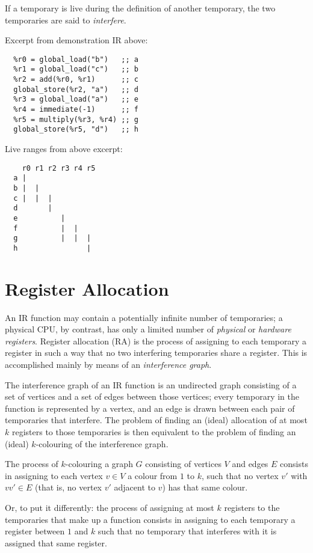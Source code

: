 \documentclass[12pt]{report}
\begin{document}
If a temporary is live during the definition of another temporary, the two temporaries are said to \emph{interfere}.

Excerpt from demonstration IR above:
\begin{Verbatim}
  %r0 = global_load("b")   ;; a
  %r1 = global_load("c")   ;; b
  %r2 = add(%r0, %r1)      ;; c
  global_store(%r2, "a")   ;; d
  %r3 = global_load("a")   ;; e
  %r4 = immediate(-1)      ;; f
  %r5 = multiply(%r3, %r4) ;; g
  global_store(%r5, "d")   ;; h
\end{Verbatim}

Live ranges from above excerpt:
\begin{Verbatim}
    r0 r1 r2 r3 r4 r5
  a |
  b |  |
  c |  |  |
  d       |
  e          |
  f          |  |
  g          |  |  |
  h                |
\end{Verbatim}

\chapter{Register Allocation}
\label{sec:codegen-register-allocation}
An IR function may contain a potentially infinite number of temporaries; a physical CPU, by contrast, has only a limited number
of \textit{physical} or \textit{hardware registers}. Register allocation (RA) is the process of assigning to each temporary a register
in such a way that no two interfering temporaries share a register. This is accomplished mainly by means of an \textit{interference graph}.

The interference graph of an IR function is an undirected graph consisting of a set of vertices and a set of edges between those
vertices; every temporary in the function is represented by a vertex, and an edge is drawn between each pair of temporaries that
interfere. The problem of finding an (ideal) allocation of at most $k$ registers to those temporaries is then equivalent to the problem
of finding an (ideal) $k$-colouring of the interference graph.

The process of $k$-colouring a graph $G$ consisting of vertices $V$ and edges $E$ consists in assigning to each vertex $v \in V$ a colour
from $1$ to $k$, such that no vertex $v'$ with $vv' \in E$ (that is, no vertex $v'$ adjacent to $v$) has that same colour.

Or, to put it differently: the process of assigning at most $k$ registers to the temporaries that make up  a function consists in assigning
 to each temporary a register between $1$ and $k$ such that no temporary that interferes with it is assigned that same register.
\end{document}
